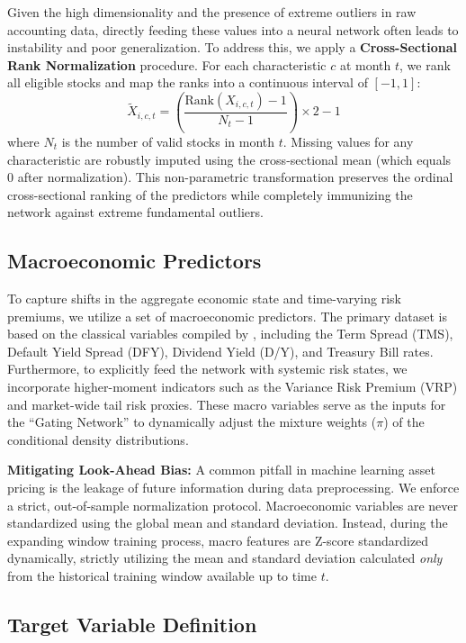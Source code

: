 \documentclass[12pt]{article}
\begin{document}
Given the high dimensionality and the presence of extreme outliers in raw accounting data, directly feeding these values into a neural network often leads to instability and poor generalization. To address this, we apply a \textbf{Cross-Sectional Rank Normalization} procedure. For each characteristic $c$ at month $t$, we rank all eligible stocks and map the ranks into a continuous interval of $[-1, 1]$:
\begin{equation}
    \tilde{X}_{i,c,t} = \left( \frac{\text{Rank}(X_{i,c,t}) - 1}{N_t - 1} \right) \times 2 - 1
\end{equation}
where $N_t$ is the number of valid stocks in month $t$. Missing values for any characteristic are robustly imputed using the cross-sectional mean (which equals 0 after normalization). This non-parametric transformation preserves the ordinal cross-sectional ranking of the predictors while completely immunizing the network against extreme fundamental outliers.

\subsection{Macroeconomic Predictors}
\label{subsec:macro_features}

To capture shifts in the aggregate economic state and time-varying risk premiums, we utilize a set of macroeconomic predictors. The primary dataset is based on the classical variables compiled by , including the Term Spread (TMS), Default Yield Spread (DFY), Dividend Yield (D/Y), and Treasury Bill rates. Furthermore, to explicitly feed the network with systemic risk states, we incorporate higher-moment indicators such as the Variance Risk Premium (VRP) and market-wide tail risk proxies. These macro variables serve as the inputs for the ``Gating Network'' to dynamically adjust the mixture weights ($\pi$) of the conditional density distributions.

\textbf{Mitigating Look-Ahead Bias:} A common pitfall in machine learning asset pricing is the leakage of future information during data preprocessing. We enforce a strict, out-of-sample normalization protocol. Macroeconomic variables are never standardized using the global mean and standard deviation. Instead, during the expanding window training process, macro features are Z-score standardized dynamically, strictly utilizing the mean and standard deviation calculated \textit{only} from the historical training window available up to time $t$. 

\subsection{Target Variable Definition}
\end{document}
